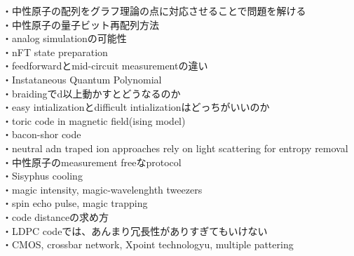 \documentclass[a4paper,10.5pt]{ltjsarticle}
\begin{document}
・中性原子の配列をグラフ理論の点に対応させることで問題を解ける\\
・中性原子の量子ビット再配列方法\\
・analog simulationの可能性\\
・nFT state preparation\\
・feedforwardとmid-circuit measurementの違い\\
・Instataneous Quantum Polynomial\\
・braidingでd以上動かすとどうなるのか\\
・easy intializationとdifficult intializationはどっちがいいのか\\
・toric code in magnetic field(ising model)\\
・bacon-shor code\\
・neutral adn traped ion approaches rely on light scattering for entropy removal\\
・中性原子のmeasurement freeなprotocol\\
・Sisyphus cooling\\
・magic intensity, magic-wavelenghth tweezers\\
・spin echo pulse, magic trapping\\
・code distanceの求め方\\
・LDPC codeでは、あんまり冗長性がありすぎてもいけない\\
・CMOS, crossbar network, Xpoint technologyu, multiple pattering\\
\end{document}
